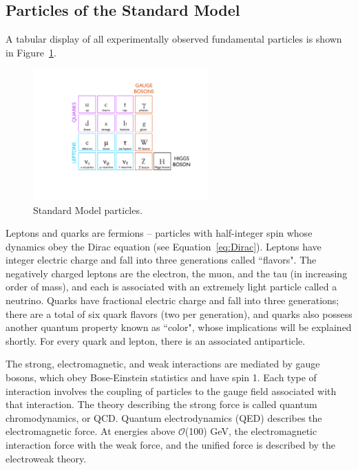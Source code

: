 \subsection{Particles of the Standard Model\label{sec:SM-particles}}

A tabular display of all experimentally observed fundamental particles is shown in Figure~\ref{fig:StandardModelTable}.

\begin{figure}
   \begin{center}
      \includegraphics[width=0.6\textwidth]{figures/StandardModelTable}
      \caption{Standard Model particles.}
      \label{fig:StandardModelTable}
   \end{center}
\end{figure}

Leptons and quarks are fermions -- particles with half-integer spin whose dynamics obey the Dirac equation (see Equation~\ref{eq:Dirac}). Leptons have integer electric charge and fall into three generations called ``flavors". The negatively charged leptons are the electron, the muon, and the tau (in increasing order of mass), and each is associated with an extremely light particle called a neutrino. Quarks have fractional electric charge and fall into three generations; there are a total of six quark flavors (two per generation), and quarks also possess another quantum property known as ``color", whose implications will be explained shortly. For every quark and lepton, there is an associated antiparticle.

The strong, electromagnetic, and weak interactions are mediated by gauge bosons, which obey Bose-Einstein statistics and have spin 1. Each type of interaction involves the coupling of particles to the gauge field associated with that interaction. The theory describing the strong force is called quantum chromodynamics, or QCD. Quantum electrodynamics (QED) describes the electromagnetic force. At energies above $\mathcal{O}$(100) GeV, the electromagnetic interaction force with the weak force, and the unified force is described by the electroweak theory.

